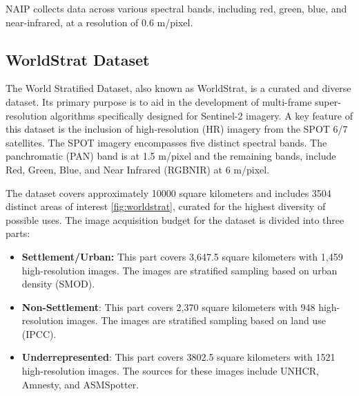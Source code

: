 NAIP collects data across various spectral bands, including red, green, blue, and near-infrared, at a resolution of 0.6 m/pixel.

\subsection{WorldStrat Dataset}
The World Stratified Dataset, also known as WorldStrat, is a curated and diverse dataset. Its primary purpose is to aid in the development of multi-frame super-resolution algorithms specifically designed for Sentinel-2 imagery. A key feature of this dataset is the inclusion of high-resolution (HR) imagery from the SPOT 6/7 satellites. The SPOT imagery encompasses five distinct spectral bands. The panchromatic (PAN) band is at 1.5 m/pixel and the remaining bands, include Red, Green, Blue, and Near Infrared (RGBNIR) at 6 m/pixel.

The dataset covers approximately 10000 square kilometers and includes 3504 distinct areas of interest \ref{fig:worldstrat}, curated for the highest diversity of possible uses. The image acquisition budget for the dataset is divided into three parts:

\begin{itemize}
    \item \textbf{Settlement/Urban:} This part covers 3,647.5 square kilometers with 1,459 high-resolution images. The images are stratified sampling based on urban density (SMOD).
    \item \textbf{Non-Settlement}: This part covers 2,370 square kilometers with 948 high-resolution images. The images are stratified sampling based on land use (IPCC).
    \item \textbf{Underrepresented}: This part covers 3802.5 square kilometers with 1521 high-resolution images. The sources for these images include UNHCR, Amnesty, and ASMSpotter.
\end{itemize}

